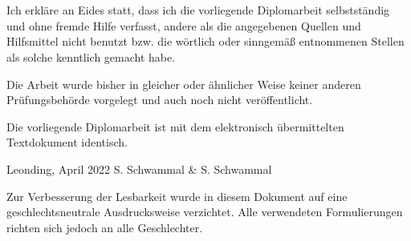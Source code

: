 \thispagestyle{empty}
\vspace{3cm}
~ \\ \\
Ich erkläre an Eides statt, dass ich die vorliegende Diplomarbeit selbstständig und ohne fremde Hilfe verfasst, andere als die angegebenen Quellen und Hilfsmittel nicht benutzt bzw. die wörtlich oder sinngemäß entnommenen Stellen als solche kenntlich gemacht habe.

Die Arbeit wurde bisher in gleicher oder ähnlicher Weise keiner anderen Prüfungsbehörde vorgelegt und auch noch nicht veröffentlicht.

Die vorliegende Diplomarbeit ist mit dem elektronisch übermittelten Textdokument identisch.
\vspace{3cm}
\begin{tabbing}
Leonding, April 2022 \hspace{5cm} S. Schwammal \& S. Schwammal
\end{tabbing}
\vspace{10cm}
Zur Verbesserung der Lesbarkeit wurde in diesem Dokument auf eine geschlechtsneutrale Ausdrucksweise verzichtet.
Alle verwendeten Formulierungen richten sich jedoch an alle Geschlechter.
\newpage
\setcounter{page}{1}
